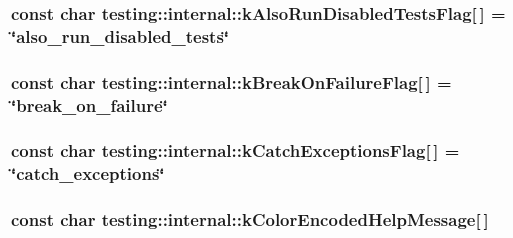 \subsubsection[{\texorpdfstring{k\+Also\+Run\+Disabled\+Tests\+Flag}{kAlsoRunDisabledTestsFlag}}]{\setlength{\rightskip}{0pt plus 5cm}const char testing\+::internal\+::k\+Also\+Run\+Disabled\+Tests\+Flag\mbox{[}$\,$\mbox{]} = \char`\"{}also\+\_\+run\+\_\+disabled\+\_\+tests\char`\"{}}\hypertarget{namespacetesting_1_1internal_ad5882ed0ceadc0f23090f0f08b5d495b}{}\label{namespacetesting_1_1internal_ad5882ed0ceadc0f23090f0f08b5d495b}
\subsubsection[{\texorpdfstring{k\+Break\+On\+Failure\+Flag}{kBreakOnFailureFlag}}]{\setlength{\rightskip}{0pt plus 5cm}const char testing\+::internal\+::k\+Break\+On\+Failure\+Flag\mbox{[}$\,$\mbox{]} = \char`\"{}break\+\_\+on\+\_\+failure\char`\"{}}\hypertarget{namespacetesting_1_1internal_a804c907155bfee3a6616ae3ca04048d0}{}\label{namespacetesting_1_1internal_a804c907155bfee3a6616ae3ca04048d0}
\subsubsection[{\texorpdfstring{k\+Catch\+Exceptions\+Flag}{kCatchExceptionsFlag}}]{\setlength{\rightskip}{0pt plus 5cm}const char testing\+::internal\+::k\+Catch\+Exceptions\+Flag\mbox{[}$\,$\mbox{]} = \char`\"{}catch\+\_\+exceptions\char`\"{}}\hypertarget{namespacetesting_1_1internal_af4bb309802e83df0927097e6e4201a38}{}\label{namespacetesting_1_1internal_af4bb309802e83df0927097e6e4201a38}
\subsubsection[{\texorpdfstring{k\+Color\+Encoded\+Help\+Message}{kColorEncodedHelpMessage}}]{\setlength{\rightskip}{0pt plus 5cm}const char testing\+::internal\+::k\+Color\+Encoded\+Help\+Message\mbox{[}$\,$\mbox{]}\hspace{0.3cm}{\ttfamily [static]}}\hypertarget{namespacetesting_1_1internal_a159395e649dd7728b09b25f70847f1ca}{}\label{namespacetesting_1_1internal_a159395e649dd7728b09b25f70847f1ca}
